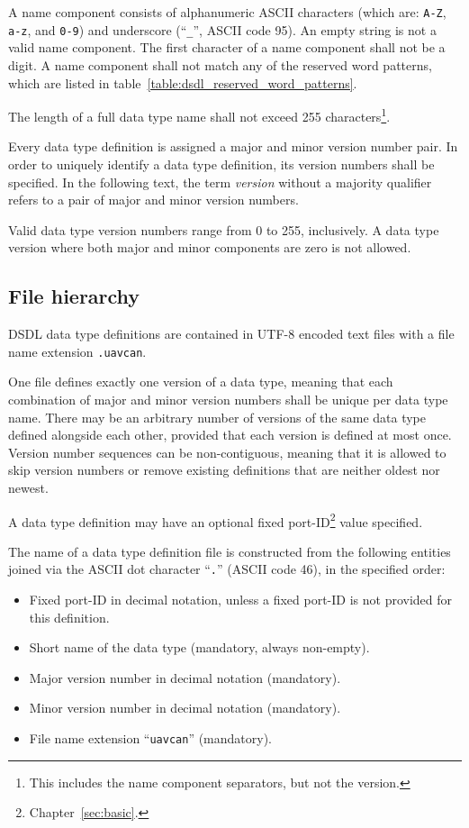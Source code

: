 A name component consists of alphanumeric ASCII characters (which are: \verb|A-Z|, \verb|a-z|, and \verb|0-9|)
and underscore (``\verb|_|'', ASCII code 95).
An empty string is not a valid name component.
The first character of a name component shall not be a digit.
A name component shall not match any of the reserved word patterns,
which are listed in table~\ref{table:dsdl_reserved_word_patterns}.

The length of a full data type name shall not exceed 255
characters\footnote{This includes the name component separators, but not the version.}.

Every data type definition is assigned a major and minor version number pair.
In order to uniquely identify a data type definition, its version numbers shall be specified.
In the following text, the term \emph{version} without a majority qualifier refers to
a pair of major and minor version numbers.

Valid data type version numbers range from 0 to 255, inclusively.
A data type version where both major and minor components are zero is not allowed.

\subsection{File hierarchy}

DSDL data type definitions are contained in UTF-8 encoded text files with a file name extension \verb|.uavcan|.

One file defines exactly one version of a data type,
meaning that each combination of major and minor version numbers shall be unique per data type name.
There may be an arbitrary number of versions of the same data type defined alongside each other,
provided that each version is defined at most once.
Version number sequences can be non-contiguous,
meaning that it is allowed to skip version numbers or remove existing definitions that are neither oldest nor newest.

A data type definition may have an optional fixed port-ID\footnote{Chapter~\ref{sec:basic}.} value specified.

The name of a data type definition file is constructed from the following entities
joined via the ASCII dot character ``\verb|.|'' (ASCII code 46), in the specified order:
\begin{itemize}
    \item Fixed port-ID in decimal notation, unless a fixed port-ID is not provided for this definition.
    \item Short name of the data type (mandatory, always non-empty).
    \item Major version number in decimal notation (mandatory).
    \item Minor version number in decimal notation (mandatory).
    \item File name extension ``\verb|uavcan|'' (mandatory).
\end{itemize}

